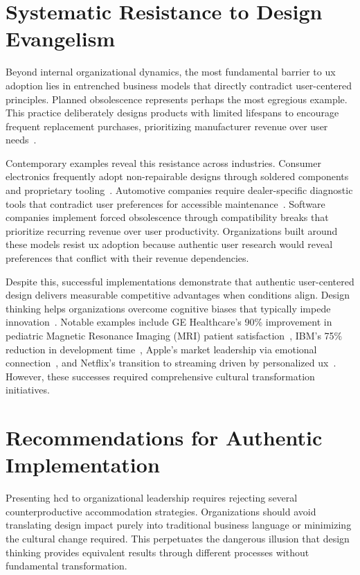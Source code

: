 \documentclass[11pt,showkeys]{../../shared/essay}
\begin{document}
\section{Systematic Resistance to Design Evangelism}

Beyond internal organizational dynamics, the most fundamental barrier to \gls{ux} adoption lies in entrenched business models that directly contradict user-centered principles. Planned obsolescence represents perhaps the most egregious example. This practice deliberately designs products with limited lifespans to encourage frequent replacement purchases, prioritizing manufacturer revenue over user needs~\cite{slade2006}. 

Contemporary examples reveal this resistance across industries. Consumer electronics frequently adopt non-repairable designs through soldered components and proprietary tooling~\cite{perzanowski2021}. Automotive companies require dealer-specific diagnostic tools that contradict user preferences for accessible maintenance~\cite{europarl2024}. Software companies implement forced obsolescence through compatibility breaks that prioritize recurring revenue over user productivity. Organizations built around these models resist \gls{ux} adoption because authentic user research would reveal preferences that conflict with their revenue dependencies.

Despite this, successful implementations demonstrate that authentic user-centered design delivers measurable competitive advantages when conditions align. Design thinking helps organizations overcome cognitive biases that typically impede innovation~\cite{liedtka2018}. Notable examples include GE Healthcare's 90\% improvement in pediatric Magnetic Resonance Imaging (MRI) patient satisfaction~\cite{brown2008}, IBM's 75\% reduction in development time~\cite{datar2021}, Apple's market leadership via emotional connection~\cite{thomke2009}, and Netflix's transition to streaming driven by personalized \gls{ux}~\cite{gulati2019}. However, these successes required comprehensive cultural transformation initiatives.

\section{Recommendations for Authentic Implementation}

Presenting \gls{hcd} to organizational leadership requires rejecting several counterproductive accommodation strategies. Organizations should avoid translating design impact purely into traditional business language or minimizing the cultural change required. This perpetuates the dangerous illusion that design thinking provides equivalent results through different processes without fundamental transformation. 
\end{document}

